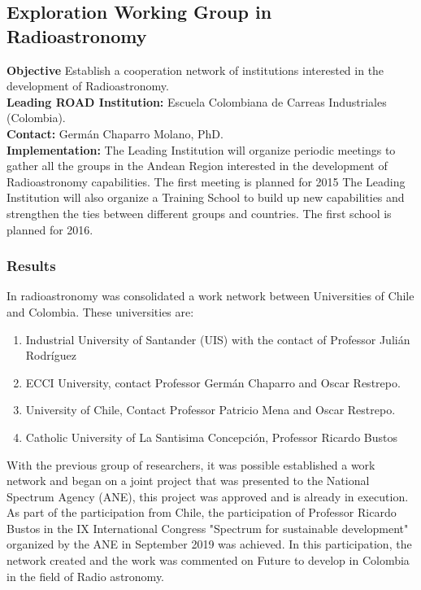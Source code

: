 

\subsection{Exploration Working Group in Radioastronomy}
\textbf{Objective} Establish a cooperation network of institutions interested in the development of Radioastronomy.
\\
\textbf{Leading ROAD Institution:} Escuela Colombiana de Carreas Industriales (Colombia).
\\
\textbf{Contact:} Germán Chaparro Molano, PhD. 
\\
\textbf{Implementation:} The Leading Institution will organize periodic meetings to gather all the groups in the Andean Region interested in the development of Radioastronomy capabilities. The first meeting is planned for 2015 The Leading Institution will also organize a Training School to build up new capabilities and strengthen the ties between different groups and countries. The first school is planned for 2016.

\subsubsection{Results}
In radioastronomy was consolidated a work network between Universities of Chile and Colombia.
These universities are:
\begin{enumerate}
    \item Industrial University of Santander (UIS) with the contact of Professor Julián Rodríguez
    \item ECCI University, contact Professor Germán Chaparro and Oscar Restrepo.
    \item University of Chile, Contact Professor Patricio Mena and Oscar Restrepo.
    \item Catholic University of La Santisima Concepción, Professor Ricardo Bustos
\end{enumerate}

With the previous group of researchers, it was possible established a work network and began on a joint project that was presented to the National Spectrum Agency (ANE), this project was approved and is already in execution. As part of the participation from Chile, the participation of Professor Ricardo Bustos in the IX International Congress "Spectrum for sustainable development" organized by the ANE in September 2019 was achieved. In this participation, the network created and the work was commented on Future to develop in Colombia in the field of Radio astronomy.

